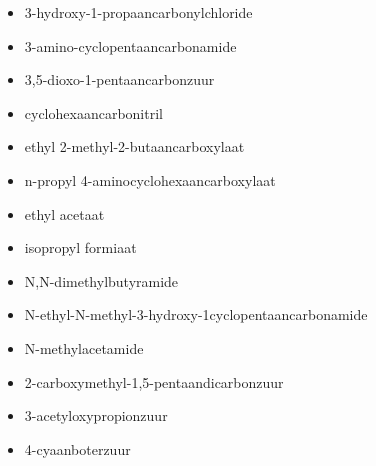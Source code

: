 \documentclass[a4paper,12pt]{article}
\begin{document}
\begin{enumerate}
\begin{enumerate}
\begin{itemize}
                    \item 3-hydroxy-1-propaancarbonylchloride
                    \item 3-amino-cyclopentaancarbonamide
                    \item 3,5-dioxo-1-pentaancarbonzuur
                    \item cyclohexaancarbonitril
                    \item ethyl 2-methyl-2-butaancarboxylaat
                    \item n-propyl 4-aminocyclohexaancarboxylaat
                    \item ethyl acetaat
                    \item isopropyl formiaat
                    \item N,N-dimethylbutyramide
                    \item N-ethyl-N-methyl-3-hydroxy-1cyclopentaancarbonamide
                    \item N-methylacetamide
                    \item 2-carboxymethyl-1,5-pentaandicarbonzuur
                    \item 3-acetyloxypropionzuur
                    \item 4-cyaanboterzuur
                \end{itemize}
        \end{enumerate}
    \end{enumerate}
\end{document}
